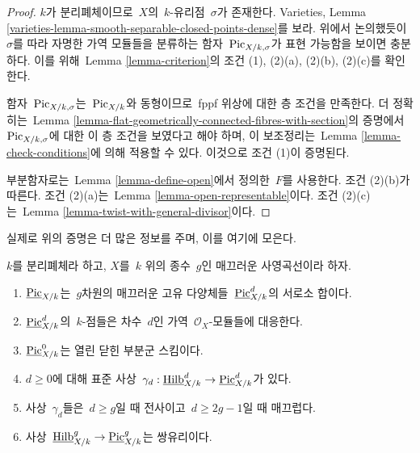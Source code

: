 \begin{proof}
$k$가 분리폐체이므로\  $X$의\  $k$-유리점\  $\sigma$가 존재한다. Varieties,
Lemma \ref{varieties-lemma-smooth-separable-closed-points-dense}를 보라.
위에서 논의했듯이\  $\sigma$를 따라 자명한 가역 모듈들을 분류하는 함자\ 
$\mathrm{Pic}_{X/k, \sigma}$가 표현 가능함을 보이면 충분하다.
이를 위해\  Lemma \ref{lemma-criterion}의 조건 (1), (2)(a), (2)(b),
(2)(c)를 확인한다.

\medskip\noindent
함자\  $\mathrm{Pic}_{X/k, \sigma}$는\  $\mathrm{Pic}_{X/k}$와 동형이므로\ 
fppf 위상에 대한 층 조건을 만족한다. 더 정확히는\  Lemma
\ref{lemma-flat-geometrically-connected-fibres-with-section}의 증명에서\ 
$\mathrm{Pic}_{X/k, \sigma}$에 대한 이 층 조건을 보였다고 해야 하며,
이 보조정리는\  Lemma \ref{lemma-check-conditions}에
의해 적용할 수 있다.
이것으로 조건 (1)이 증명된다.

\medskip\noindent
부분함자로는\  Lemma \ref{lemma-define-open}에서 정의한\  $F$를 사용한다.
조건 (2)(b)가 따른다. 조건 (2)(a)는\  Lemma
\ref{lemma-open-representable}이다. 조건 (2)(c)는\  Lemma
\ref{lemma-twist-with-general-divisor}이다.
\end{proof}

\noindent
실제로 위의 증명은 더 많은 정보를 주며, 이를 여기에 모은다.

\begin{lemma}
\label{lemma-picard-pieces}
$k$를 분리폐체라 하고, $X$를\  $k$ 위의 종수\  $g$인 매끄러운 사영곡선이라
하자.
\begin{enumerate}
\item $\underline{\mathrm{Pic}}_{X/k}$는\  $g$차원의 매끄러운 고유
다양체들\  $\underline{\mathrm{Pic}}^d_{X/k}$의 서로소 합이다.
\item $\underline{\mathrm{Pic}}^d_{X/k}$의\  $k$-점들은 차수\  $d$인 가역\ 
$\mathcal{O}_X$-모듈들에 대응한다.
\item $\underline{\mathrm{Pic}}^0_{X/k}$는 열린 닫힌 부분군 스킴이다.
\item $d \geq 0$에 대해 표준 사상\ 
$\gamma_d :
\underline{\mathrm{Hilb}}^d_{X/k} \to \underline{\mathrm{Pic}}^d_{X/k}$가 있다.
\item 사상\  $\gamma_d$들은\  $d \geq g$일 때 전사이고\ 
$d \geq 2g - 1$일 때 매끄럽다.
\item 사상\ 
$\underline{\mathrm{Hilb}}^g_{X/k} \to \underline{\mathrm{Pic}}^g_{X/k}$는
쌍유리이다.
\end{enumerate}
\end{lemma}

